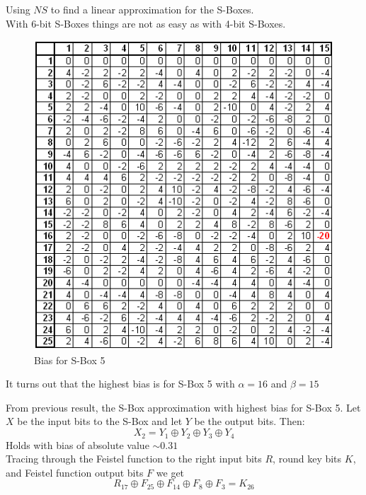 \documentclass[9pt]{beamer}
\begin{document}
\begin{frame}
Using $NS$ to find a linear approximation for the S-Boxes.\\
\vspace{5mm}
With 6-bit S-Boxes things are not as easy as with 4-bit S-Boxes.
\begin{figure}
\includegraphics[totalheight=0.5\textheight]{NS_S5.PNG}
\caption{Bias for S-Box 5 }
\end{figure}
It turns out that the highest bias is for S-Box 5 with $\alpha = 16$ and $\beta = 15$
\end{frame}

\begin{frame}
From previous result, the S-Box approximation with highest bias for S-Box 5. Let $X$ be the input bits to the S-Box and let $Y$ be the output bits. Then:
\[ X_{2} = Y_{1} \oplus Y_{2} \oplus Y_{3} \oplus Y_{4} \]
Holds with bias of absolute value $\sim 0.31$\\
\vspace{5mm}
Tracing through the Feistel function to the right input bits $R$, round key bits $K$, and Feistel function output bits $F$ we get
\[ R_{17} \oplus F_{25} \oplus F_{14} \oplus F_{8} \oplus F_{3} = K_{26} \]

\end{frame}
\end{document}

